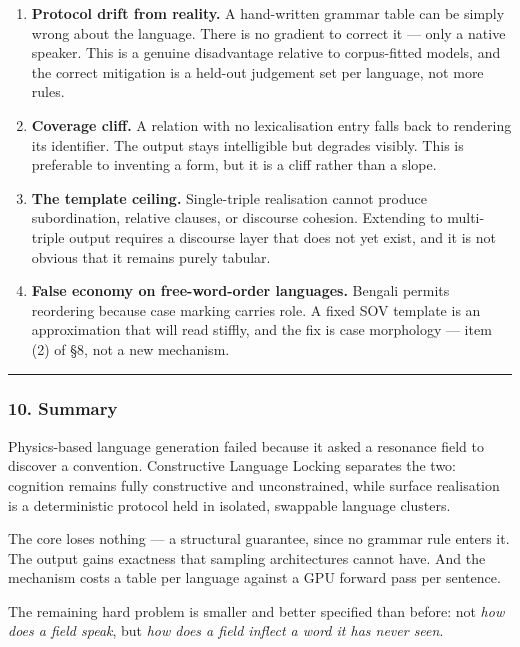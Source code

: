 \documentclass[
  11pt,
  a4paper,
]{article}
\begin{document}
\begin{enumerate}
\def\labelenumi{\arabic{enumi}.}
\item
  \textbf{Protocol drift from reality.} A hand-written grammar table can
  be simply wrong about the language. There is no gradient to correct it
  --- only a native speaker. This is a genuine disadvantage relative to
  corpus-fitted models, and the correct mitigation is a held-out
  judgement set per language, not more rules.
\item
  \textbf{Coverage cliff.} A relation with no lexicalisation entry falls
  back to rendering its identifier. The output stays intelligible but
  degrades visibly. This is preferable to inventing a form, but it is a
  cliff rather than a slope.
\item
  \textbf{The template ceiling.} Single-triple realisation cannot
  produce subordination, relative clauses, or discourse cohesion.
  Extending to multi-triple output requires a discourse layer that does
  not yet exist, and it is not obvious that it remains purely tabular.
\item
  \textbf{False economy on free-word-order languages.} Bengali permits
  reordering because case marking carries role. A fixed SOV template is
  an approximation that will read stiffly, and the fix is case
  morphology --- item (2) of §8, not a new mechanism.
\end{enumerate}

\begin{center}\rule{0.5\linewidth}{0.5pt}\end{center}

\subsubsection{10. Summary}\label{summary}

Physics-based language generation failed because it asked a resonance
field to discover a convention. Constructive Language Locking separates
the two: cognition remains fully constructive and unconstrained, while
surface realisation is a deterministic protocol held in isolated,
swappable language clusters.

The core loses nothing --- a structural guarantee, since no grammar rule
enters it. The output gains exactness that sampling architectures cannot
have. And the mechanism costs a table per language against a GPU forward
pass per sentence.

The remaining hard problem is smaller and better specified than before:
not \emph{how does a field speak}, but \emph{how does a field inflect a
word it has never seen}.
\end{document}
